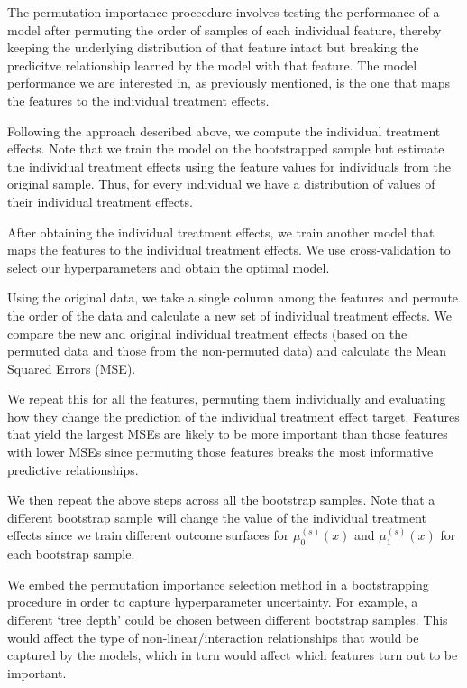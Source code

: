 \documentclass[12pt, a4paper]{article}
\begin{document}
The permutation importance proceedure involves testing the performance of a
model after permuting the order of samples of each individual feature, thereby
keeping the underlying distribution of that feature intact but breaking the
predicitve relationship learned by the model with that feature. The model
performance we are interested in, as previously mentioned, is the one that maps
the features to the individual treatment effects. 

Following the approach described above, we compute the individual treatment effects. Note that we train the model on the bootstrapped sample but estimate the individual
treatment effects using the feature values for individuals from the original
sample. Thus, for every individual we have a distribution of values of their
individual treatment effects.

After obtaining the individual treatment effects, we train another model that
maps the features to the individual treatment effects. We use cross-validation
to select our hyperparameters and obtain the optimal model. 

Using the original data, we take a single column among the features and
permute the order of the data and calculate a new set of individual treatment
effects. We compare the new and original individual treatment effects (based on
the permuted data and those from the non-permuted data) and calculate the Mean
Squared Errors (MSE). 

We repeat this for all the features, permuting them individually and evaluating
how they change the prediction of the individual treatment effect target.
Features that yield the largest MSEs are likely to be more important than those
features with lower MSEs since permuting those features breaks the
most informative predictive relationships. 

We then repeat the above steps across all the bootstrap samples. Note that a
different bootstrap sample will change the value of the individual treatment
effects since we train different outcome surfaces for $\mu^{(s)}_0(x)$ and
$\mu^{(s)}_1(x)$ for each bootstrap sample.

We embed the permutation importance selection method in a bootstrapping
procedure in order to capture hyperparameter uncertainty. For example, a
different `tree depth' could be chosen between different bootstrap samples.
This would affect the type of non-linear/interaction relationships that would
be captured by the models, which in turn would affect which features turn out
to be important. 
\end{document}
